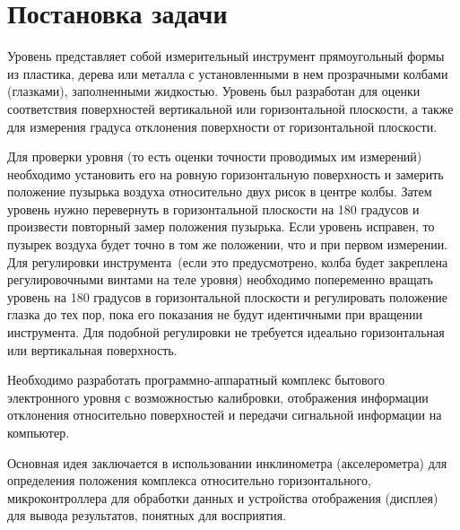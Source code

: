 \documentclass[document.tex]{subfiles}
\begin{document}
\section{Постановка задачи}
Уровень представляет собой измерительный инструмент прямоугольный формы из
пла\-стика, дерева или металла с установленными в нем прозрачными колбами
(глазками), запол\-ненными жидкостью. Уровень был разработан для оценки
соответствия поверхностей верти\-кальной или горизонтальной плоскости, а также
для измерения градуса отклонения поверх\-ности от горизонтальной плоскости.

Для проверки уровня (то есть оценки точности проводимых им измерений) необходимо
установить его на ровную горизонтальную поверхность и замерить положение
пузырька воздуха относительно двух рисок в центре колбы. Затем уровень нужно
перевернуть в горизонтальной плоскости на 180 градусов и произвести повторный
замер положения пузырь\-ка. Если уровень исправен, то пузырек воздуха будет точно
в том же положении, что и при первом измерении. Для регулировки
инструмента~(если это предусмотрено, колба будет закреплена регулировочными
винтами на теле уровня) необходимо попеременно вращать уровень на 180 градусов в
горизонтальной плоскости и регулировать положение глазка до тех пор, пока его
показания не будут идентичными при вращении инструмента. Для подобной
регулировки не требуется идеально горизонтальная или вертикальная
поверхность.\cite{spiritlevel_info}

Необходимо разработать программно-аппаратный комплекс бытового электронного
уров\-ня с возможностью калибровки, отображения информации отклонения относительно
поверх\-ностей и передачи сигнальной информации на компьютер.

Основная идея заключается в использовании инклинометра (акселерометра) для опреде\-ления положения комплекса относительно горизонтального, микроконтроллера для обработки данных
и устройства отображения (дисплея) для вывода результатов, понятных для воспри\-ятия.
\end{document}
